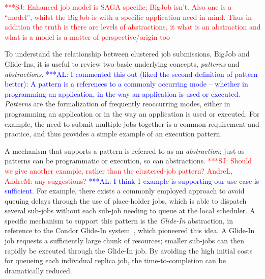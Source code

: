\documentclass{rspublic}
\newcommand{\alnote}[1]{ {\textcolor{blue} { ***AL: #1 }}}
\newcommand{\jhanote}[1]{ {\textcolor{red} { ***SJ: #1 }}}
\newcommand{\alnote}[1]{}
\newcommand{\jhanote}[1]{}
\newcommand{\I}[1]{\textit{#1}}
\begin{document}
\jhanote{Enhanced job model is SAGA specific; BigJob isn't. Also one
  is a ``model'', whilst the BigJob is with a specific application
  need in mind. Thus in addition the truth is there are levels of
  abstractions, it what is an abstraction and what is a model is a
  matter of perspective/origin too}              

To understand the relationship between clustered job submissions,
BigJob and Gli\-de-Ins, it is useful to review two basic underlying
concepts, \I{patterns} and \I{abstractions}.  \alnote{I commented this
  out (liked the second definition of pattern better): A pattern is a
  references to a commonly occurring mode -- whether in programming an
  application, in the way an application is used or executed.}
\I{Patterns} are the formalization of frequently reoccurring modes,
either in programming an application or in the way an application is
used or executed.
For example, the need to submit multiple jobs together is a common
requirement and practice, and thus provides a simple example of an
execution pattern.  

A mechanism that supports a pattern is referred to as an
\I{abstraction}; just as patterns can be programmatic or execution, so
can abstractions.  \jhanote{Should we give another example, rather
  than the clustered-job pattern? AndreL, AndreM: any suggestions?}
\alnote{I think 1 example is supporting our use case is sufficient.}
For example, there exists a commonly employed approach to avoid
queuing delays through the use of place-holder jobs, which is able to
dispatch several sub-jobs without each sub-job needing to queue at the
local scheduler. A specific mechanism to support this pattern is the
\emph{Glide-In} abstraction, in reference to the Condor Glide-In
system~\citep{citeulike:291860}, which pioneered this idea. A Glide-In
job requests a sufficiently large chunk of resources; smaller sub-jobs
can then rapidly be executed through the Glide-In job.  By avoiding
the high initial costs for queueing each individual replica job, the
time-to-completion can be dramatically reduced.
\end{document}
